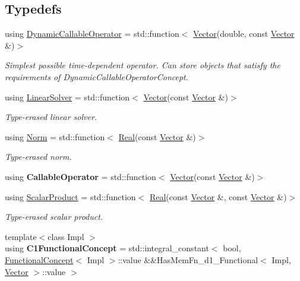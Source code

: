 \subsection*{Typedefs}
\begin{DoxyCompactItemize}
\item 
using \hyperlink{namespaceSpacy_ad81a1e86d95b7d87a67d152fc01ee83e}{Dynamic\+Callable\+Operator} = std\+::function$<$ \hyperlink{classSpacy_1_1Vector}{Vector}(double, const \hyperlink{classSpacy_1_1Vector}{Vector} \&)$>$
\begin{DoxyCompactList}\small\item\em Simplest possible time-\/dependent operator. Can store objects that satisfy the requirements of Dynamic\+Callable\+Operator\+Concept. \end{DoxyCompactList}\item 
\hypertarget{namespaceSpacy_a4cd614ddb41dd29e68a723dadd5602f2}{}using \hyperlink{namespaceSpacy_a4cd614ddb41dd29e68a723dadd5602f2}{Linear\+Solver} = std\+::function$<$ \hyperlink{classSpacy_1_1Vector}{Vector}(const \hyperlink{classSpacy_1_1Vector}{Vector} \&)$>$\label{namespaceSpacy_a4cd614ddb41dd29e68a723dadd5602f2}

\begin{DoxyCompactList}\small\item\em Type-\/erased linear solver. \end{DoxyCompactList}\item 
using \hyperlink{namespaceSpacy_a0dbe77a4e1282ef88017e94d50d17791}{Norm} = std\+::function$<$ \hyperlink{classSpacy_1_1Real}{Real}(const \hyperlink{classSpacy_1_1Vector}{Vector} \&)$>$
\begin{DoxyCompactList}\small\item\em Type-\/erased norm. \end{DoxyCompactList}\item 
\hypertarget{namespaceSpacy_ab4cfd8f41e0beb5b8b0b410658016b95}{}using {\bfseries Callable\+Operator} = std\+::function$<$ \hyperlink{classSpacy_1_1Vector}{Vector}(const \hyperlink{classSpacy_1_1Vector}{Vector} \&)$>$\label{namespaceSpacy_ab4cfd8f41e0beb5b8b0b410658016b95}

\item 
using \hyperlink{namespaceSpacy_aa995526aa0e3fa58aca8dd6772311cad}{Scalar\+Product} = std\+::function$<$ \hyperlink{classSpacy_1_1Real}{Real}(const \hyperlink{classSpacy_1_1Vector}{Vector} \&, const \hyperlink{classSpacy_1_1Vector}{Vector} \&)$>$
\begin{DoxyCompactList}\small\item\em Type-\/erased scalar product. \end{DoxyCompactList}\item 
\hypertarget{namespaceSpacy_a0f9fcb851e928f78cfecb72d7af8935e}{}{\footnotesize template$<$class Impl $>$ }\\using {\bfseries C1\+Functional\+Concept} = std\+::integral\+\_\+constant$<$ bool, \hyperlink{group__ConceptGroup_gae45328d2e01ef6c8e5d948b69fda385f}{Functional\+Concept}$<$ Impl $>$\+::value \&\&Has\+Mem\+Fn\+\_\+d1\+\_\+\+Functional$<$ Impl, \hyperlink{classSpacy_1_1Vector}{Vector} $>$\+::value $>$\label{namespaceSpacy_a0f9fcb851e928f78cfecb72d7af8935e}


\end{DoxyCompactItemize}
